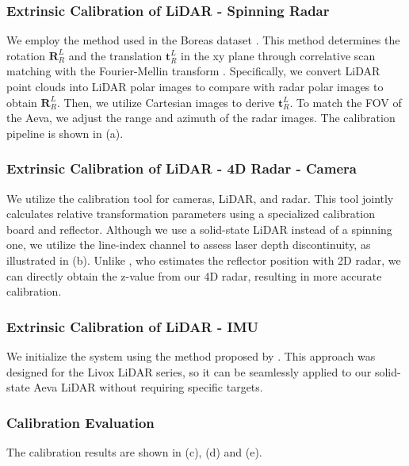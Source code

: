 \subsubsection{Extrinsic Calibration of \ac{LiDAR} - Spinning Radar}
We employ the method used in the Boreas dataset \cite{burnett2023boreas}. This method determines the rotation $\textbf{R}^L_R$ and the translation $\textbf{t}^L_R$ in the xy plane through correlative scan matching with the Fourier-Mellin transform \cite{checchin2010radar}. Specifically, we convert \ac{LiDAR} point clouds into \ac{LiDAR} polar images to compare with radar polar images to obtain $\textbf{R}^L_R$. Then, we utilize Cartesian images to derive $\textbf{t}^L_R$. To match the \ac{FOV} of the Aeva, we adjust the range and azimuth of the radar images. The calibration pipeline is shown in (a).


\subsubsection{Extrinsic Calibration of \ac{LiDAR} - 4D Radar - Camera}
We utilize the calibration tool \cite{domhof2021joint} for cameras, \ac{LiDAR}, and radar. This tool jointly calculates relative transformation parameters using a specialized calibration board and reflector. Although we use a solid-state \ac{LiDAR} instead of a spinning one, we utilize the line-index channel to assess laser depth discontinuity, as illustrated in (b). Unlike \citeauthor{domhof2021joint} \cite{domhof2021joint}, who estimates the reflector position with 2D radar, we can directly obtain the z-value from our 4D radar, resulting in more accurate calibration.


\subsubsection{Extrinsic Calibration of \ac{LiDAR} - \ac{IMU}}
We initialize the system using the method proposed by \citeauthor{zhu2022robust} \cite{zhu2022robust}. This approach was designed for the Livox \ac{LiDAR} series, so it can be seamlessly applied to our solid-state Aeva \ac{LiDAR} without requiring specific targets.


\subsubsection{Calibration Evaluation}
The calibration results are shown in (c), (d) and (e).


